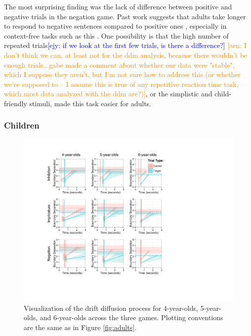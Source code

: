 \documentclass[10pt,letterpaper]{article}
\newcommand{\ejy}[1]{\textcolor{Blue}{[ejy: #1]}}  %
\newcommand{\aen}[1]{\textcolor{DarkOrange}{[aen: #1]}}
\begin{document}
The most surprising finding was the lack of difference between positive and negative trials in the negation game.  Past work suggests that adults take longer to respond to negative sentences compared to positive ones \cite{hclark1972}, especially in context-free tasks such as this \cite{nordmeyer2014a}.  One possibility is that the high number of repeated trials\ejy{if we look at the first few trials, is there a difference?} \aen{I don't think we can, at least not for the ddm analysis, because there wouldn't be enough trials...gabe made a comment about whether our data were "stable", which I suppose they aren't, but I'm not sure how to address this (or whether we're supposed to -- I assume this is true of any repetitive reaction time task, which most data analyzed with the ddm are?)}, or the simplistic and child-friendly stimuli, made this task easier for adults.

\subsubsection{Children}

\begin{figure}
\begin{center} 
\includegraphics[width=6in]{figures/child_vis.pdf}
\caption{\label{fig:kids} Visualization of the drift diffusion process for 4-year-olds, 5-year-olds, and 6-year-olds across the three games.  Plotting conventions are the same as in Figure \ref{fig:adults}.}
\end{center} 
\end{figure}
\end{document}
